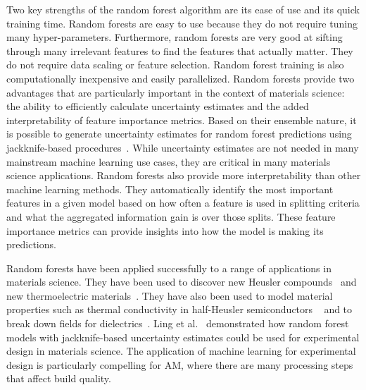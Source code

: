 Two key strengths of the random forest algorithm are its ease of use and its quick training time. Random forests are easy to use because they do not require tuning many hyper-parameters. Furthermore, random forests are very good at sifting through many irrelevant features to find the features that actually matter. They do not require data scaling or feature selection. Random forest training is also computationally inexpensive and easily parallelized. Random forests provide two advantages that are particularly important in the context of materials science: the ability to efficiently calculate uncertainty estimates and the added interpretability of feature importance metrics. Based on their ensemble nature, it is possible to generate uncertainty estimates for random forest predictions using jackknife-based procedures~\cite{Efron1992, Efron2014, Wager2014}. While uncertainty estimates are not needed in many mainstream machine learning use cases, they are critical in many materials science applications. Random forests also provide more interpretability than other machine learning methods. They automatically identify the most important features in a given model based on how often a feature is used in splitting criteria and what the aggregated information gain is over those splits. These feature importance metrics can provide insights into how the model is making its predictions. 


Random forests have been applied successfully to a range of applications in materials science. They have been used to discover new Heusler compounds~\cite{Oliynyk2016} and new thermoelectric materials~\cite{Gaultois2016}. They have also been used to model material properties such as thermal conductivity in half-Heusler semiconductors ~\cite{Carrete2014} and to break down fields for dielectrics~\cite{Kim2016}. Ling et al.~\cite{Ling2017} demonstrated how random forest models with jackknife-based uncertainty estimates could be used for experimental design in materials science. The application of machine learning for experimental design is particularly compelling for AM, where there are many processing steps that affect build quality. 

